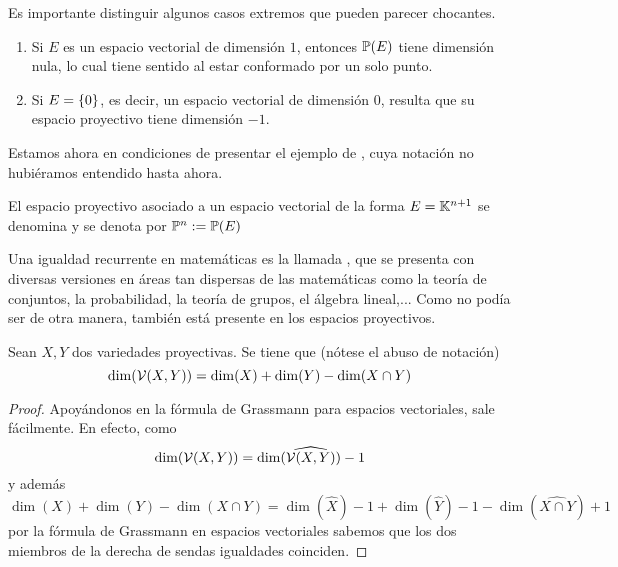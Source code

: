 Es importante distinguir algunos casos extremos que pueden parecer chocantes.
\begin{obs}
	\begin{enumerate}
		\item Si $E$ es un espacio vectorial de dimensión $1$, entonces $\mathbb{P}(E)$ tiene dimensión nula, lo cual tiene sentido al estar conformado por un solo punto.
		\item Si $E =\{0\}$, es decir, un espacio vectorial de dimensión $0$, resulta que su espacio proyectivo tiene dimensión $-1$.\qedhere
	\end{enumerate}
\end{obs}
Estamos ahora en condiciones de presentar el ejemplo de , cuya notación no hubiéramos entendido hasta ahora.
\begin{exa}
	El espacio proyectivo asociado a un espacio vectorial de la forma $E=\mathbb{K}^{n+1}$ se denomina  y se denota por $\mathbb{P}^n:=\mathbb{P}(E)$
\end{exa}
Una igualdad recurrente en matemáticas es la llamada , que se presenta con diversas versiones en áreas tan dispersas de las matemáticas como la teoría de conjuntos, la probabilidad, la teoría de grupos, el álgebra lineal,... Como no podía ser de otra manera, también está presente en los espacios proyectivos.
\begin{theo}
	\label{C1_teo_grassmann}
	Sean $X,Y$ dos variedades proyectivas. Se tiene que (nótese el abuso de notación)
	\begin{equation*}
		\dim(\mathcal{V}(X,Y))=\dim(X)+\dim(Y)-\dim(X\cap Y)
	\end{equation*}
\end{theo}
\begin{proof}
	Apoyándonos en la fórmula de Grassmann para espacios vectoriales, sale fácilmente. En efecto, como  \begin{equation*}
		\dim(\mathcal{V}(X,Y))=\dim(\widehat{\mathcal{V}(X,Y)})-1
	\end{equation*} y además \begin{equation*}
		\dim(X)+\dim(Y)-\dim(X\cap Y)=\dim(\widehat{X})-1+\dim(\widehat{Y})-1-\dim(\widehat{X\cap Y})+1
	\end{equation*} por la fórmula de Grassmann en espacios vectoriales sabemos que los dos miembros de la derecha de sendas igualdades coinciden.
\end{proof}

